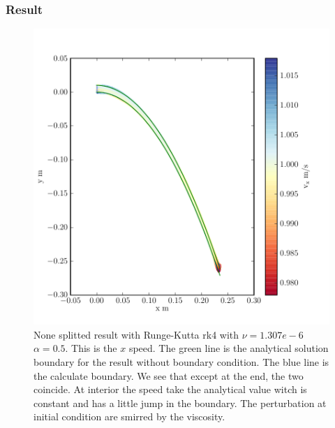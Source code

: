 \subsubsection{Result}
\begin{figure}
	\includegraphics{topology/lateral_jet/plot_8__1_186.pdf}
	\caption{None splitted result with Runge-Kutta rk4 with $\nu=1.307e-6$ $\alpha=0.5$.
	This is the $x$ speed.
	The green line is the analytical solution boundary for the result without boundary condition.
	The blue line is the calculate boundary.
	We see that except at the end, the two coincide.
	At interior the speed take the analytical value witch is constant and has a little jump in the boundary.
	The perturbation at initial condition are smirred by the viscosity.}
	\label{topo:extrap:lateral:8_1}
\end{figure}

